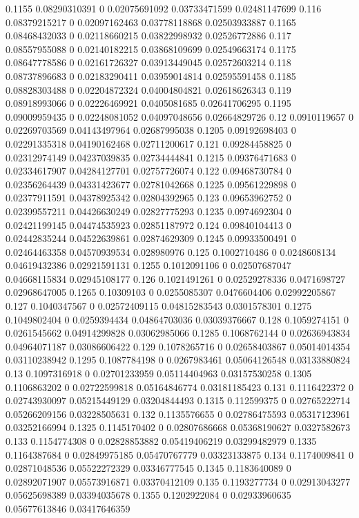 {0.1155 0.08290310391 0 0.02075691092 0.03733471599 0.02481147699
0.116 0.08379215217 0 0.02097162463 0.03778118868 0.02503933887
0.1165 0.08468432033 0 0.02118660215 0.03822998932 0.02526772886
0.117 0.08557955088 0 0.02140182215 0.03868109699 0.02549663174
0.1175 0.08647778586 0 0.02161726327 0.03913449045 0.02572603214
0.118 0.08737896683 0 0.02183290411 0.03959014814 0.02595591458
0.1185 0.08828303488 0 0.02204872324 0.04004804821 0.02618626343
0.119 0.08918993066 0 0.02226469921 0.0405081685 0.02641706295
0.1195 0.09009959435 0 0.02248081052 0.04097048656 0.02664829726
0.12 0.0910119657 0 0.02269703569 0.04143497964 0.02687995038
0.1205 0.09192698403 0 0.02291335318 0.04190162468 0.02711200617
0.121 0.09284458825 0 0.02312974149 0.04237039835 0.02734444841
0.1215 0.09376471683 0 0.02334617907 0.04284127701 0.02757726074
0.122 0.09468730784 0 0.02356264439 0.04331423677 0.02781042668
0.1225 0.09561229898 0 0.02377911591 0.04378925342 0.02804392965
0.123 0.09653962752 0 0.02399557211 0.04426630249 0.02827775293
0.1235 0.0974692304 0 0.02421199145 0.04474535923 0.02851187972
0.124 0.09840104413 0 0.02442835244 0.04522639861 0.02874629309
0.1245 0.09933500491 0 0.02464463358 0.04570939534 0.028980976
0.125 0.1002710486 0 0.0248608134 0.04619432386 0.02921591131
0.1255 0.1012091106 0 0.02507687047 0.04668115834 0.02945108177
0.126 0.1021491261 0 0.02529278336 0.0471698727 0.02968647005
0.1265 0.10309103 0 0.0255085307 0.0476604406 0.02992205867
0.127 0.1040347567 0 0.02572409115 0.04815283543 0.0301578301
0.1275 0.1049802404 0 0.0259394434 0.04864703036 0.03039376667
0.128 0.1059274151 0 0.0261545662 0.04914299828 0.03062985066
0.1285 0.1068762144 0 0.02636943834 0.04964071187 0.03086606422
0.129 0.1078265716 0 0.02658403867 0.05014014354 0.03110238942
0.1295 0.1087784198 0 0.0267983461 0.05064126548 0.03133880824
0.13 0.1097316918 0 0.02701233959 0.05114404963 0.03157530258
0.1305 0.1106863202 0 0.02722599818 0.05164846774 0.03181185423
0.131 0.1116422372 0 0.02743930097 0.05215449129 0.03204844493
0.1315 0.112599375 0 0.02765222714 0.05266209156 0.03228505631
0.132 0.1135576655 0 0.02786475593 0.05317123961 0.03252166994
0.1325 0.1145170402 0 0.02807686668 0.05368190627 0.0327582673
0.133 0.1154774308 0 0.02828853882 0.05419406219 0.03299482979
0.1335 0.1164387684 0 0.02849975185 0.05470767779 0.03323133875
0.134 0.1174009841 0 0.02871048536 0.05522272329 0.03346777545
0.1345 0.1183640089 0 0.02892071907 0.05573916871 0.03370412109
0.135 0.1193277734 0 0.02913043277 0.05625698389 0.03394035678
0.1355 0.1202922084 0 0.02933960635 0.05677613846 0.03417646359
}
